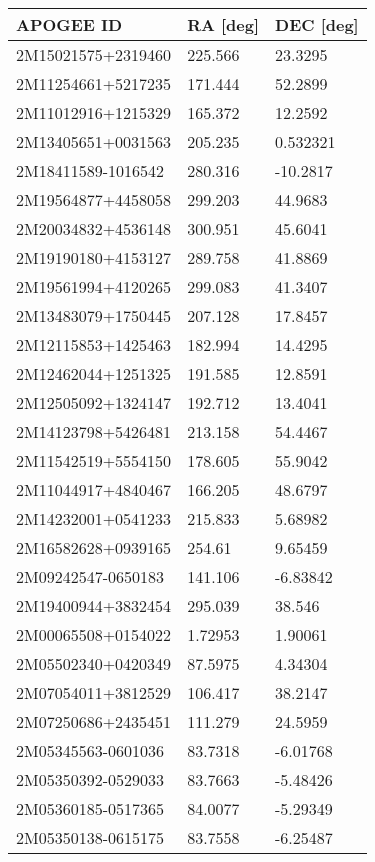 \documentclass[fleqn,usenatbib]{mnras}
\begin{document}
\begin{table}
\centering
  \begin{tabular}{lll}
  \toprule
  APOGEE ID  &       RA [deg] &       DEC [deg]                                     \\
  \midrule
2M15021575+2319460 &  225.566 &   23.3295 \\
2M11254661+5217235 &  171.444 &   52.2899 \\
2M11012916+1215329 &  165.372 &   12.2592 \\
2M13405651+0031563 &  205.235 &  0.532321 \\
2M18411589-1016542 &  280.316 &  -10.2817 \\
2M19564877+4458058 &  299.203 &   44.9683 \\
2M20034832+4536148 &  300.951 &   45.6041 \\
2M19190180+4153127 &  289.758 &   41.8869 \\
2M19561994+4120265 &  299.083 &   41.3407 \\
2M13483079+1750445 &  207.128 &   17.8457 \\
2M12115853+1425463 &  182.994 &   14.4295 \\
2M12462044+1251325 &  191.585 &   12.8591 \\
2M12505092+1324147 &  192.712 &   13.4041 \\
2M14123798+5426481 &  213.158 &   54.4467 \\
2M11542519+5554150 &  178.605 &   55.9042 \\
2M11044917+4840467 &  166.205 &   48.6797 \\
2M14232001+0541233 &  215.833 &   5.68982 \\
2M16582628+0939165 &   254.61 &   9.65459 \\
2M09242547-0650183 &  141.106 &  -6.83842 \\
2M19400944+3832454 &  295.039 &    38.546 \\
2M00065508+0154022 &  1.72953 &   1.90061 \\
2M05502340+0420349 &  87.5975 &   4.34304 \\
2M07054011+3812529 &  106.417 &   38.2147 \\
2M07250686+2435451 &  111.279 &   24.5959 \\
2M05345563-0601036 &  83.7318 &  -6.01768 \\
2M05350392-0529033 &  83.7663 &  -5.48426 \\
2M05360185-0517365 &  84.0077 &  -5.29349 \\
2M05350138-0615175 &  83.7558 &  -6.25487 \\

\end{tabular}
\end{table}
\end{document}
